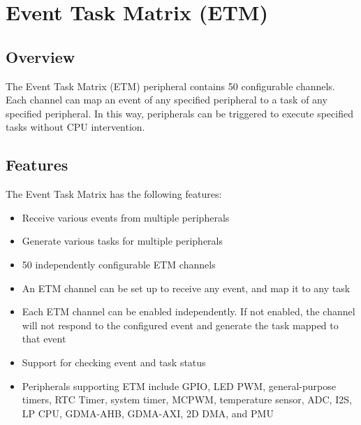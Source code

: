 \documentclass[main\_\_EN.tex]{subfiles}
\begin{document}

\ifglobal
\else
    {\let\clearpage\relax \listoftodos}
    {\let\clearpage\relax \listofdonetodos}
    \tableofcontents
\fi



\hypertarget{evntaskmatrix}{}
\chapter{Event Task Matrix (ETM)}
\label{mod:evntaskmatrix}



\section{Overview}
The Event Task Matrix (ETM) peripheral contains 50 configurable channels. Each channel can map an event of any specified peripheral to a task of any specified peripheral. In this way, peripherals can be triggered to execute specified tasks without CPU intervention.



\section{Features}
\label{sec:evntaskmatrix-features}

The Event Task Matrix has the following features:
\begin{itemize}
    \item Receive various events from multiple peripherals
    \item Generate various tasks for multiple peripherals
    \item 50 independently configurable ETM channels
    \item An ETM channel can be set up to receive any event, and map it to any task
    \item Each ETM channel can be enabled independently. If not enabled, the channel will not respond to the configured event and generate the task mapped to that event
    \item Support for checking event and task status
    \item Peripherals supporting ETM include GPIO, LED PWM, general-purpose timers, RTC Timer, system timer, MCPWM, temperature sensor, ADC, I2S, LP CPU, GDMA-AHB, GDMA-AXI, 2D DMA, and PMU
\end{itemize}
\end{document}
